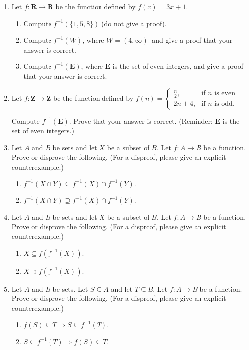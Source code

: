 \documentclass[12pt]{article}
\begin{document}
\begin{enumerate}
\item Let $f \colon \mathbf{R} \to \mathbf{R}$ be the function defined by $f(x) = 3x+1$. 
 \begin{enumerate}
 \item Compute $f^{-1}(\{1,5,8\})$ (do not give a proof).
 \item Compute $f^{-1}(W)$, where $W = (4,\infty)$, and give a proof that your answer is correct.
 \item Compute $f^{-1}(\mathbf{E})$, where $\mathbf{E}$ is the set of even integers, and give a proof that your answer is correct.
 \end{enumerate}

\item Let $f \colon \mathbf{Z} \to \mathbf{Z}$ be the function defined by $f(n) =
 \begin{cases}
 \frac{n}{2}, & \text{if $n$ is even} \\
 2n+4, & \text{if $n$ is odd}.
 \end{cases}
 $
 
 Compute $f^{-1}(\mathbf{E})$. Prove that your answer is correct. (Reminder: $\mathbf{E}$ is the set of even integers.)

\item Let $A$ and $B$ be sets and let $X$ be a subset of $B$. Let $f\colon A \to B$ be a function. Prove or disprove the following. (For a disproof, please give an explicit counterexample.) 
  \begin{enumerate}
  \item $f^{-1}(X \cap Y) \subseteq f^{-1}(X) \cap f^{-1}(Y)$.
  \item $f^{-1}(X \cap Y) \supseteq f^{-1}(X) \cap f^{-1}(Y)$.
  \end{enumerate}


\item Let $A$ and $B$ be sets and let $X$ be a subset of $B$. Let $f\colon A \to B$ be a function. Prove or disprove the following. (For a disproof, please give an explicit counterexample.)
 \begin{enumerate}
 \item $X \subseteq f(f^{-1}(X))$.
 \item $X \supset f(f^{-1}(X))$.
 \end{enumerate}

\item Let $A$ and $B$ be sets. Let $S \subseteq A$ and let $T \subseteq B$. Let $f\colon A \to B$ be a function. Prove or disprove the following. (For a disproof, please give an explicit counterexample.)
 \begin{enumerate}
 \item $f(S) \subseteq T \Rightarrow S \subseteq f^{-1}(T)$.
 \item $S \subseteq f^{-1}(T) \Rightarrow f(S) \subseteq T$.
 \end{enumerate}


\end{enumerate}
\end{document}

